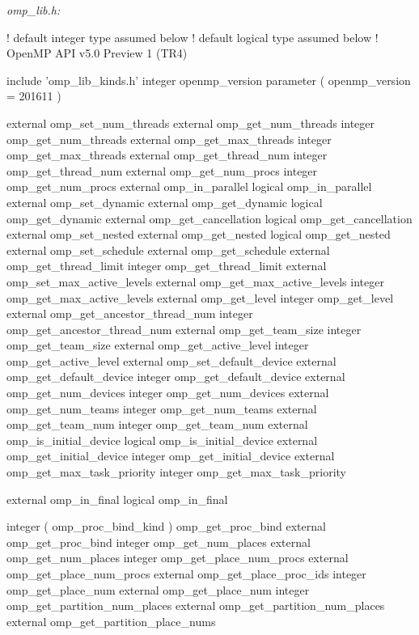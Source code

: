 {\emph{omp\_lib.h:}

{\small \begin{codepar}
! default integer type assumed below
! default logical type assumed below
! OpenMP API v5.0 Preview 1 (TR4)

     include 'omp\_lib\_kinds.h'
     integer openmp\_version
     parameter ( openmp\_version = 201611 )

     external omp\_set\_num\_threads
     external omp\_get\_num\_threads
     integer omp\_get\_num\_threads
     external omp\_get\_max\_threads
     integer omp\_get\_max\_threads
     external omp\_get\_thread\_num
     integer omp\_get\_thread\_num
     external omp\_get\_num\_procs
     integer omp\_get\_num\_procs
     external omp\_in\_parallel
     logical omp\_in\_parallel
     external omp\_set\_dynamic
     external omp\_get\_dynamic
     logical omp\_get\_dynamic
     external omp\_get\_cancellation
     logical omp\_get\_cancellation
     external omp\_set\_nested
     external omp\_get\_nested
     logical omp\_get\_nested
     external omp\_set\_schedule
     external omp\_get\_schedule
     external omp\_get\_thread\_limit
     integer omp\_get\_thread\_limit
     external omp\_set\_max\_active\_levels
     external omp\_get\_max\_active\_levels
     integer omp\_get\_max\_active\_levels
     external omp\_get\_level
     integer omp\_get\_level
     external omp\_get\_ancestor\_thread\_num
     integer omp\_get\_ancestor\_thread\_num
     external omp\_get\_team\_size
     integer omp\_get\_team\_size
     external omp\_get\_active\_level
     integer omp\_get\_active\_level
     external omp\_set\_default\_device
     external omp\_get\_default\_device
     integer omp\_get\_default\_device
     external omp\_get\_num\_devices
     integer omp\_get\_num\_devices
     external omp\_get\_num\_teams
     integer omp\_get\_num\_teams
     external omp\_get\_team\_num
     integer omp\_get\_team\_num
     external omp\_is\_initial\_device
     logical omp\_is\_initial\_device
     external omp\_get\_initial\_device
     integer omp\_get\_initial\_device
     external omp\_get\_max\_task\_priority
     integer omp\_get\_max\_task\_priority

     external omp\_in\_final
     logical omp\_in\_final

     integer ( omp\_proc\_bind\_kind ) omp\_get\_proc\_bind
     external omp\_get\_proc\_bind
     integer omp\_get\_num\_places
     external omp\_get\_num\_places
     integer omp\_get\_place\_num\_procs
     external omp\_get\_place\_num\_procs
     external omp\_get\_place\_proc\_ids
     integer omp\_get\_place\_num
     external omp\_get\_place\_num
     integer omp\_get\_partition\_num\_places
     external omp\_get\_partition\_num\_places
     external omp\_get\_partition\_place\_nums
     

\end{codepar}}}
